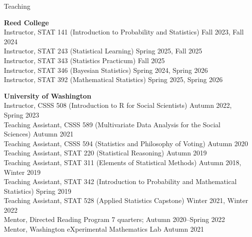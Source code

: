 \documentclass{resume} %
\begin{document}
\begin{rSection}{Teaching}

\textbf{Reed College}
\\ Instructor, STAT 141 (Introduction to Probability and Statistics) \hfill {Fall 2023, Fall 2024}
\\ Instructor, STAT 243 (Statistical Learning) \hfill {Spring 2025, Fall 2025}
\\ Instructor, STAT 343 (Statistics Practicum) \hfill {Fall 2025}
\\ Instructor, STAT 346 (Bayesian Statistics) \hfill {Spring 2024, Spring 2026}
\\ Instructor, STAT 392 (Mathematical Statistics) \hfill {Spring 2025, Spring 2026}

\textbf{University of Washington}
\\ Instructor, CSSS 508 (Introduction to R for Social Scientists) \hfill {Autumn 2022, Spring 2023}
\\ Teaching Assistant, CSSS 589 (Multivariate Data Analysis for the Social Sciences) \hfill Autumn 2021
\\ Teaching Assistant, CSSS 594 (Statistics and Philosophy of Voting) \hfill Autumn 2020
\\ Teaching Assistant, STAT 220 (Statistical Reasoning) \hfill {Autumn 2019}
\\ Teaching Assistant, STAT 311 (Elements of Statistical Methods) \hfill {Autumn 2018, Winter 2019}
\\ Teaching Assistant, STAT 342 (Introduction to Probability and Mathematical Statistics) \hfill {Spring 2019}
\\ Teaching Assistant, STAT 528 (Applied Statistics Capstone) \hfill {Winter 2021, Winter 2022}
\\ Mentor, Directed Reading Program \hfill{7 quarters; Autumn 2020--Spring 2022}
\\ Mentor, Washington eXperimental Mathematics Lab \hfill {Autumn 2021}

\end{rSection}
\end{document}
